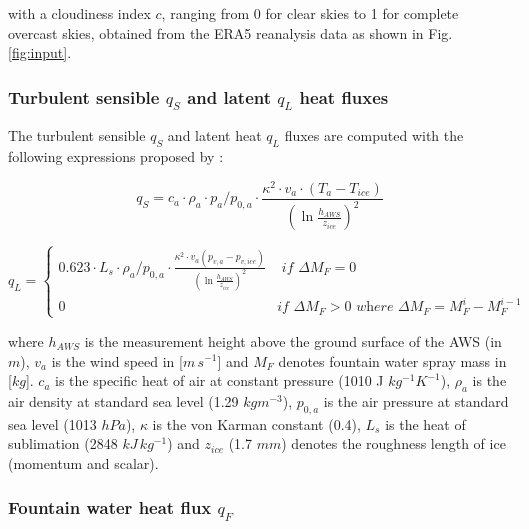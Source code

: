 \documentclass[utf8]{frontiersSCNS} %
\begin{document}
with a cloudiness index $c$, ranging from 0 for clear skies to 1 for complete overcast skies, obtained from the ERA5
reanalysis data as shown in Fig.  \ref{fig:input}.

\subsubsection{Turbulent sensible $q_{S}$ and latent $q_{L}$ heat fluxes }

The turbulent sensible $q_{S}$ and latent heat $q_{L}$ fluxes are computed with the following expressions proposed by
\cite{Garratt_1992}:

\begin{equation} q_{S}=c_{a} \cdot \rho_{a} \cdot p_{a}/p_{0,a} \cdot \frac{\kappa^2 \cdot v_a \cdot
(T_a-T_{ice})}{{(\ln{\frac{h_{AWS}}{z_{ice}}})}^2} \label{eqn:qs} \end{equation}

\begin{equation} q_{L} = \left\{ \begin{array}{ll}
        
         0.623 \cdot L_s \cdot \rho_{a}/p_{0,a} \cdot \frac{\kappa^2 \cdot
         v_a(p_{v,a}-p_{v,ice})}{{(\ln{\frac{h_{AWS}}{z_{ice}}})}^2} & \textit{ if } \Delta M_{F} = 0\\ 0 & \textit{
       if } \Delta M_{F} > 0 \textit{ where } \Delta M_{F} = M_{F}^{i} - M_{F}^{i-1}
         
    \end{array} \right.  \label{eqn:ql} \end{equation}

where $h_{AWS}$ is the measurement height above the ground surface of the AWS (in $m$), $v_a$ is the wind speed in
[$m\,s^{-1}$] and $M_{F}$ denotes fountain water spray mass in [$kg$]. $c_a$ is the specific heat of air at constant
pressure (1010 J $kg^{-1} K^{-1}$), $\rho_{a}$ is the air density at standard sea level (1.29 $kg m^{-3}$), $p_{0,a}$
is the air pressure at standard sea level (1013 $hPa$), $\kappa$ is the von Karman constant (0.4), $L_s$ is the heat
of sublimation (2848 $kJ\, kg^{-1}$) and $z_{ice}$ (1.7 $mm$) denotes the roughness length of ice (momentum and
scalar).


\subsubsection{Fountain water heat flux $q_{F}$ }
\end{document}
